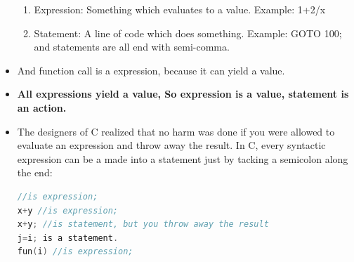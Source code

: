 \documentclass[a4paper,12pt,twoside]{book}
\begin{document}
\begin{itemize}
    \begin{enumerate}
    	\item Expression: Something which evaluates to a value. Example: 1+2/x
    	\item Statement: A line of code which does something. Example: GOTO 100; and statements are all end with semi-comma.
    \end{enumerate}

    \item And function call is a expression, because it can yield a value.
    
    \item \textbf{All expressions yield a value, So expression is a value, statement is an action.}
    

    \item The designers of C realized that no harm was done if you were allowed to evaluate an expression and throw away the result. In C, every syntactic expression can be a made into a statement just by tacking a semicolon along the end:
    
\begin{lstlisting}[frame=single, language=c++]
//is expression;
x+y //is expression;
x+y; //is statement, but you throw away the result
j=i; is a statement.
fun(i) //is expression;
\end{lstlisting}
    
\end{itemize}
\end{document}
